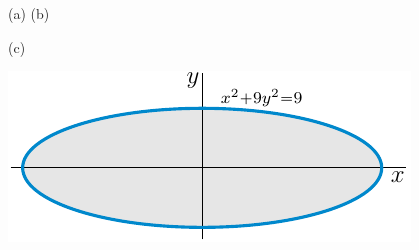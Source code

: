 
\begin{answer}
\begin{center}
    (a)\quad 
     \hfill
    (b)\quad {}
\end{center}

(c)
\begin{center}
     \includegraphics{fig/polar6c2.pdf}
\end{center}

\end{answer}

